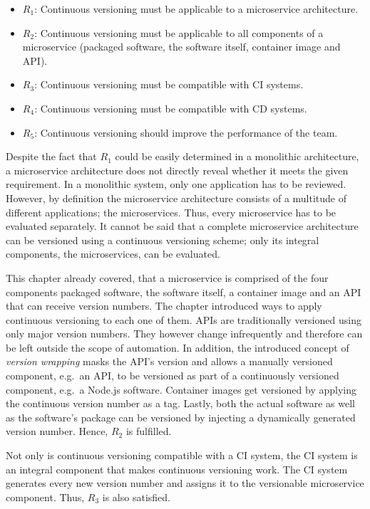 \begin{itemize}
  \item $R_1$: Continuous versioning must be applicable to a microservice
    architecture.
  \item $R_2$: Continuous versioning must be applicable to all components of a
    microservice (packaged software, the software itself, container image and
    \ac{API}).
  \item $R_3$: Continuous versioning must be compatible with \ac{CI} systems.
  \item $R_4$: Continuous versioning must be compatible with \ac{CD} systems.
  \item $R_5$: Continuous versioning should improve the performance of the team.
\end{itemize}

Despite the fact that $R_1$ could be easily determined in a monolithic
architecture, a microservice architecture does not directly reveal whether it
meets the given requirement. In a monolithic system, only one application has
to be reviewed. However, by definition the microservice architecture consists
of a multitude of different applications; the microservices. Thus, every
microservice has to be evaluated separately. It cannot be said that a complete
microservice architecture can be versioned using a continuous versioning
scheme; only its integral components, the microservices, can be evaluated.

This chapter already covered, that a microservice is comprised of the four
components packaged software, the software itself, a container image and an
\ac{API} that can receive version numbers. The chapter introduced ways to apply
continuous versioning to each one of them. \acp{API} are traditionally
versioned using only major version numbers. They however change infrequently
and therefore can be left outside the scope of automation. In addition, the
introduced concept of \textit{version wrapping} masks the \ac{API}'s version
and allows a manually versioned component, e.g.\ an \ac{API}, to be versioned
as part of a continuously versioned component, e.g.\ a Node.js software.
Container images get versioned by applying the continuous version number as a
tag. Lastly, both the actual software as well as the software's package can be
versioned by injecting a dynamically generated version number. Hence, $R_2$ is
fulfilled.

Not only is continuous versioning compatible with a \ac{CI} system, the \ac{CI}
system is an integral component that makes continuous versioning work. The
\ac{CI} system generates every new version number and assigns it to the
versionable microservice component. Thus, $R_3$ is also satisfied.

